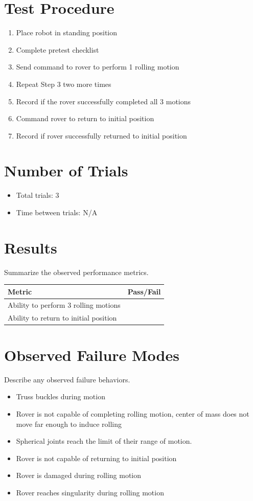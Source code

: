 \documentclass[11pt]{article}
\begin{document}
\section*{Test Procedure}
\begin{enumerate}[noitemsep]
    \item Place robot in standing position
    \item Complete pretest checklist
    \item Send command to rover to perform 1 rolling motion
    \item Repeat Step 3 two more times 
    \item Record if the rover successfully completed all 3 motions
    \item Command rover to return to initial position
    \item Record if rover successfully returned to initial position

\end{enumerate}

\section*{Number of Trials}
\begin{itemize}[noitemsep]
    \item Total trials: 3
    \item Time between trials: N/A
\end{itemize}

\section*{Results}
Summarize the observed performance metrics.

\begin{center}
\begin{tabular}{lc}
\toprule
Metric & Pass/Fail\\
\midrule
Ability to perform 3 rolling motions&  \\
 Ability to return to initial position &\\
\end{tabular}
\end{center}

\section*{Observed Failure Modes}
Describe any observed failure behaviors.

\begin{itemize}[noitemsep]
    \item Truss buckles during motion
    \item Rover is not capable of completing rolling motion, center of mass does not move far enough to induce rolling
    \item Spherical joints reach the limit of their range of motion. 
    \item Rover is not capable of returning to initial position
    \item Rover is damaged during rolling motion
    \item Rover reaches singularity during rolling motion
\end{itemize}
\end{document}
